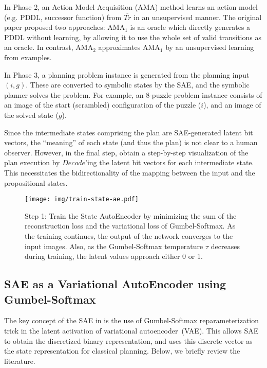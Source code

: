 In Phase 2, an Action Model Acquisition (AMA) method learns an action model (e.g. PDDL, successor function) from $\overline{Tr}$ in an unsupervised manner.
The original paper proposed two approaches: AMA$_1$ is an oracle which directly generates a PDDL without learning,
by allowing it to use the whole set of valid transitions as an oracle.
In contrast, AMA$_2$ approximates AMA$_1$ by an unsupervised learning from examples.

In Phase 3, a planning problem instance is generated from the planning input $(i,g)$.
These are converted to symbolic states by the SAE, and the symbolic planner solves the problem.
For example, an 8-puzzle problem instance consists of an image of the start (scrambled) configuration of the puzzle ($i$), and an image of the solved state ($g$).

Since the intermediate states comprising the plan are SAE-generated latent bit vectors, the ``meaning'' of each state (and thus the plan) is not clear to a human observer.
However, in the final step, \latentplanner obtain a step-by-step visualization of the plan execution
by $Decode$'ing the latent bit vectors for each intermediate state.
This necessitates the bidirectionality of the mapping between the input and the propositional states.

\begin{figure}[tb]
 \texttt{[image: img/train-state-ae.pdf]}
 \caption{Step 1:
Train the State AutoEncoder by
 minimizing the sum of the reconstruction loss and the variational loss of Gumbel-Softmax.
As the training continues, the output of the network converges to the input images.
Also, as the Gumbel-Softmax temperature $\tau$ decreases during training,
the latent values approach either 0 or 1.}
 \label{sae}
\end{figure}

\subsection{SAE as a Variational AutoEncoder using Gumbel-Softmax}

The key concept of the SAE in \latentplanner is the use of Gumbel-Softmax \cite{jang2016categorical}
reparameterization trick in the latent activation of variational autoencoder~(VAE).
This allows SAE to obtain the
discretized binary representation, and \latentplanner uses this
discrete vector as the state representation for classical planning.
Below, we briefly review the literature.


